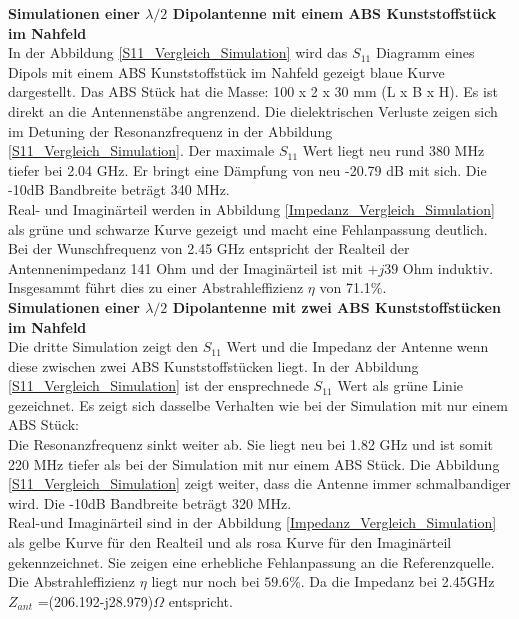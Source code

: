 \textbf{Simulationen einer $\lambda/2$ Dipolantenne mit einem ABS Kunststoffstück im Nahfeld}\\
In der Abbildung \ref{S11_Vergleich_Simulation} wird das $S_{11}$ Diagramm eines Dipols mit einem ABS Kunststoffstück im Nahfeld gezeigt  blaue Kurve dargestellt. Das ABS Stück hat die Masse: 100 x 2 x 30 mm (L x B x H). Es ist direkt an die Antennenstäbe angrenzend. Die dielektrischen Verluste zeigen sich im Detuning der Resonanzfrequenz in der Abbildung \ref{S11_Vergleich_Simulation}. Der maximale $S_{11}$ Wert liegt neu rund 380 MHz tiefer bei 2.04 GHz. Er bringt eine Dämpfung von neu -20.79 dB mit sich. Die -10dB Bandbreite beträgt 340 MHz.\\

Real- und Imaginärteil werden in Abbildung \ref{Impedanz_Vergleich_Simulation} als grüne und schwarze Kurve gezeigt und macht eine Fehlanpassung deutlich. Bei der Wunschfrequenz von 2.45 GHz entspricht der Realteil der Antennenimpedanz 141 Ohm und der Imaginärteil ist mit $+j39$ Ohm induktiv. Insgesammt führt dies zu einer Abstrahleffizienz $\eta$ von 71.1$\%$.\\

\textbf{Simulationen einer $\lambda/2$ Dipolantenne mit zwei ABS Kunststoffstücken im Nahfeld}\\
Die dritte Simulation zeigt den $S_{11}$ Wert und die Impedanz der Antenne wenn diese zwischen zwei ABS Kunststoffstücken liegt. In der Abbildung \ref{S11_Vergleich_Simulation} ist der ensprechnede $S_{11}$ Wert als grüne Linie gezeichnet. Es zeigt sich dasselbe Verhalten wie bei der Simulation mit nur einem ABS Stück: \\
Die Resonanzfrequenz sinkt weiter ab. Sie liegt neu bei 1.82 GHz und ist somit 220 MHz tiefer als bei der Simulation mit nur einem ABS Stück. Die Abbildung \ref{S11_Vergleich_Simulation} zeigt weiter, dass die Antenne immer schmalbandiger wird. Die -10dB Bandbreite beträgt 320 MHz.\\
Real-und Imaginärteil sind in der Abbildung \ref{Impedanz_Vergleich_Simulation} als gelbe Kurve für den Realteil und als rosa Kurve für den Imaginärteil gekennzeichnet. Sie zeigen eine erhebliche Fehlanpassung an die Referenzquelle. Die Abstrahleffizienz $\eta$ liegt nur noch bei $59.6 \%$. Da die Impedanz bei 2.45GHz $Z_{ant}$ =(206.192-j28.979)$\Omega$  entspricht.\\




